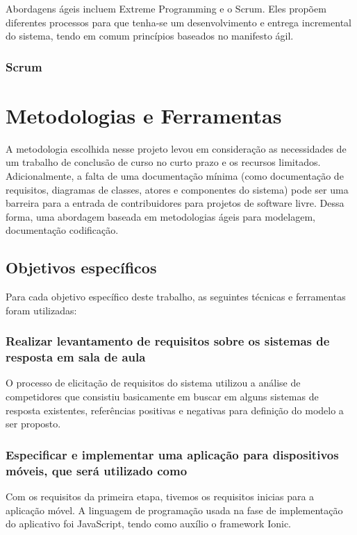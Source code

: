 Abordagens ágeis incluem Extreme Programming e o Scrum. Eles propõem diferentes processos
para que tenha-se um desenvolvimento e entrega incremental do sistema, tendo em comum princípios
baseados no manifesto ágil.

\subsubsection{Scrum}


\section{Metodologias e Ferramentas}
A metodologia escolhida nesse projeto levou em consideração as necessidades de um trabalho de
conclusão de curso no curto prazo e os recursos limitados. Adicionalmente, a falta de uma documentação
mínima (como documentação de requisitos, diagramas de classes, atores e componentes do sistema)
pode ser uma barreira para a entrada de contribuidores para projetos de software livre. Dessa forma,
uma abordagem baseada em metodologias ágeis para modelagem, documentação codificação.

\subsection{Objetivos específicos}

Para cada objetivo específico deste trabalho, as seguintes técnicas e ferramentas foram utilizadas:

\subsubsection{Realizar levantamento de requisitos sobre os sistemas de resposta em sala de aula}

O processo de elicitação de requisitos do sistema utilizou a análise de competidores que
consistiu basicamente em buscar em alguns sistemas de resposta existentes, referências positivas e
negativas para definição do modelo a ser proposto.

\subsubsection{Especificar e implementar uma aplicação para dispositivos móveis, que será utilizado como {\clickers}}

Com os requisitos da primeira etapa, tivemos os requisitos inicias para a aplicação móvel.
A linguagem de programação usada na fase de implementação do aplicativo foi JavaScript, tendo como auxílio o framework Ionic.

